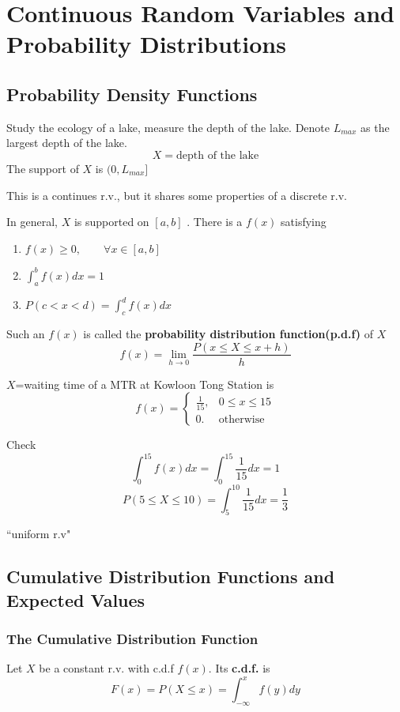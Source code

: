 \chapter[Continuous Random Variables]{Continuous Random Variables and Probability Distributions}
\section{Probability Density Functions}
\begin{exmp}
Study the ecology of a lake, measure the depth of the lake. Denote $L_{max}$ as the largest depth of the lake.
\[X = \text{depth of the lake}\]
The support of $X$ is $(0, L_{max}]$ 

This is a continues r.v., but it shares some properties of a discrete r.v.
\end{exmp}

\begin{defn}
In general, $X$ is supported on $[a,b]$ . There is a $f(x)$ satisfying
\begin{enumerate}
\item $f(x) \geq 0, \qquad \forall x \in [a,b]$
\item $\int _a^b f(x) dx=1$
\item $P(c<x<d)=\int _c^d f(x)dx$
\end{enumerate}

Such an $f(x)$ is called the \textbf{probability distribution function(p.d.f)} of $X$
\[f(x)=\lim_{h \to 0} \frac{P(x \leq X \leq x+h)}{h} \]
\end{defn}

\begin{exmp}
$X$=waiting time of a MTR at Kowloon Tong Station is 
\[f(x)=\begin{cases}
\frac{1}{15}, 	&0 \leq x \leq 15\\
0. &\text{otherwise}
\end{cases}\]

Check
\[\int_0^{15} f(x)dx=\int_0^{15} \frac{1}{15}dx=1\]
\[P(5\leq X \leq 10)=\int_5^{10} \frac{1}{15}dx=\frac{1}{3}\]

``uniform r.v"
\end{exmp}

\section{Cumulative Distribution Functions and Expected Values}
\subsection{The Cumulative Distribution Function}
\begin{defn}
Let $X$ be a constant r.v. with c.d.f $f(x)$. Its \textbf{c.d.f.} is 
\[F(x)=P(X \leq x)=\int_{-\infty}^{x}f(y)dy\]
\end{defn}

